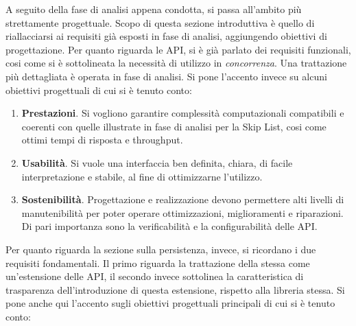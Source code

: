 
%

	A seguito della fase di analisi appena condotta, si passa all'ambito più strettamente progettuale. Scopo di questa sezione introduttiva è quello di riallacciarsi ai requisiti già esposti in fase di analisi, aggiungendo obiettivi di progettazione. Per quanto riguarda le API, si è già parlato dei requisiti funzionali, cosi come si è sottolineata la necessità di utilizzo in \textit{concorrenza}. Una trattazione più dettagliata è operata in fase di analisi. Si pone l'accento invece su alcuni obiettivi progettuali di cui si è tenuto conto:
	
	\begin{enumerate}
		\item \textbf{Prestazioni}. Si vogliono garantire complessità computazionali compatibili e coerenti con quelle illustrate in fase di analisi per la Skip List, cosi come ottimi tempi di risposta e throughput.
	  	\item \textbf{Usabilità}. Si vuole una interfaccia ben definita, chiara, di facile interpretazione e stabile, al fine di ottimizzarne l'utilizzo.
	  	\item \textbf{Sostenibilità}. Progettazione e realizzazione devono permettere alti livelli di manutenibilità per poter operare ottimizzazioni, miglioramenti e riparazioni. Di pari importanza sono la verificabilità e la configurabilità delle API.
	\end{enumerate}
	 
	Per quanto riguarda la sezione sulla persistenza, invece, si ricordano i due requisiti fondamentali. Il primo riguarda la trattazione della stessa come un'estensione delle API, il secondo invece sottolinea la caratteristica di trasparenza dell'introduzione di questa estensione, rispetto alla libreria stessa.
	Si pone anche qui l'accento sugli obiettivi progettuali principali di cui si è tenuto conto:
	
